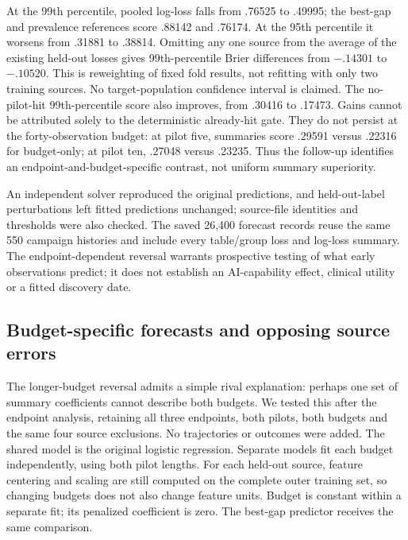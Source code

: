 \begin{table}[htbp]\centering\small
\caption{Paired Brier difference, summaries minus budget-only, at pilot five/budget 20. Negative favors summaries. These are four descriptive source contrasts, not independent draws from a specified scientific population.}
\label{tab:endpoint_family}

\end{table}

At the 99th percentile, pooled log-loss falls from .76525 to .49995; the best-gap and prevalence references score .88142 and .76174. At the 95th percentile it worsens from .31881 to .38814. Omitting any one source from the average of the existing held-out losses gives 99th-percentile Brier differences from $-.14301$ to $-.10520$. This is reweighting of fixed fold results, not refitting with only two training sources. No target-population confidence interval is claimed. The no-pilot-hit 99th-percentile score also improves, from .30416 to .17473. Gains cannot be attributed solely to the deterministic already-hit gate. They do not persist at the forty-observation budget: at pilot five, summaries score .29591 versus .22316 for budget-only; at pilot ten, .27048 versus .23235. Thus the follow-up identifies an endpoint-and-budget-specific contrast, not uniform summary superiority.

An independent solver reproduced the original predictions, and held-out-label perturbations left fitted predictions unchanged; source-file identities and thresholds were also checked. The saved 26,400 forecast records reuse the same 550 campaign histories and include every table/group loss and log-loss summary. The endpoint-dependent reversal warrants prospective testing of what early observations predict; it does not establish an AI-capability effect, clinical utility or a fitted discovery date.


\subsection{Budget-specific forecasts and opposing source errors}
\label{app:horizon_diagnostic}
The longer-budget reversal admits a simple rival explanation: perhaps one set of summary coefficients cannot describe both budgets. We tested this after the endpoint analysis, retaining all three endpoints, both pilots, both budgets and the same four source exclusions. No trajectories or outcomes were added. The shared model is the original logistic regression. Separate models fit each budget independently, using both pilot lengths. For each held-out source, feature centering and scaling are still computed on the complete outer training set, so changing budgets does not also change feature units. Budget is constant within a separate fit; its penalized coefficient is zero. The best-gap predictor receives the same comparison.

